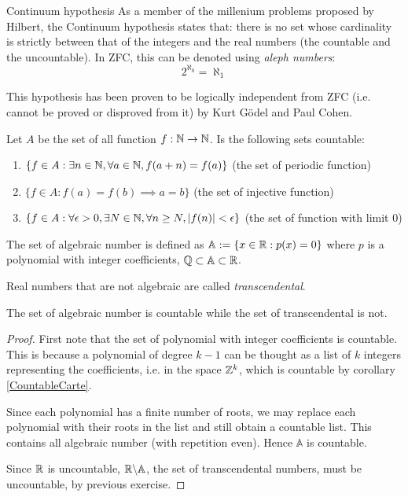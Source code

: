 \documentclass[11pt]{article}
\begin{document}
\begin{extension}{Continuum hypothesis}
  As a member of the millenium problems proposed by Hilbert, the Continuum hypothesis states that: there is no set whose cardinality is strictly between that of the integers and the real numbers (the countable and the uncountable). In ZFC, this can be denoted using \emph{aleph numbers}:
  \begin{equation*}
    2^{\aleph_0}=\aleph_1
  \end{equation*}

  This hypothesis has been proven to be logically independent from ZFC (i.e. cannot be proved or disproved from it) by Kurt Gödel and Paul Cohen.
\end{extension}

\begin{problem}
  Let \(A\) be the set of all function \(f:\mathbb{N}\to\mathbb{N}\). Is the following sets countable:
  \begin{enumerate}
    \item \(\{f\in A: \exists n\in\mathbb{N}, \forall a\in\mathbb{N}, f(a+n)=f(a)\}\) (the set of periodic function)
    \item \(\{f\in A: f(a)=f(b) \implies a=b\}\) (the set of injective function)
    \item \(\{f\in A: \forall \epsilon >0, \exists N\in\mathbb{N}, \forall n\geq N, |f(n)|<\epsilon\}\) (the set of function with limit 0)
  \end{enumerate}
\end{problem}
\begin{solution}
\end{solution}

\begin{definition}
  The set of algebraic number is defined as \(\mathbb{A}:=\{x\in\mathbb{R}:p(x)=0\}\) where \(p\) is a polynomial with integer coefficients, \(\mathbb{Q} \subset \mathbb{A} \subset \mathbb{R}\).
  
  \vspace{5pt}Real numbers that are not algebraic are called \emph{transcendental}.
\end{definition}

\begin{proposition}
  The set of algebraic number is countable while the set of transcendental is not.
\end{proposition}
\begin{proof}
  First note that the set of polynomial with integer coefficients is countable. This is because a polynomial of degree \(k-1\) can be thought as a list of \(k\) integers representing the coefficients, i.e. in the space \(\mathbb{Z}^k\), which is countable by corollary \ref{CountableCarte}.
  
  Since each polynomial has a finite number of roots, we may replace each polynomial with their roots in the list and still obtain a countable list. This contains all algebraic number (with repetition even). Hence \(\mathbb{A}\) is countable.

  Since \(\mathbb{R}\) is uncountable, \(\mathbb{R}\backslash\mathbb{A}\), the set of transcendental numbers, must be uncountable, by previous exercise.
\end{proof}
\end{document}
